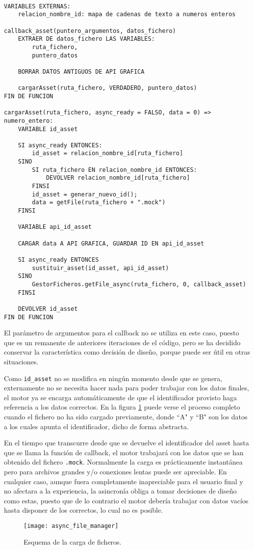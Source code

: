 \begin{lstlisting}

VARIABLES EXTERNAS:
    relacion_nombre_id: mapa de cadenas de texto a numeros enteros
    
callback_asset(puntero_argumentos, datos_fichero)
    EXTRAER DE datos_fichero LAS VARIABLES:
        ruta_fichero,
        puntero_datos
        
    BORRAR DATOS ANTIGUOS DE API GRAFICA
    
    cargarAsset(ruta_fichero, VERDADERO, puntero_datos)
FIN DE FUNCION

cargarAsset(ruta_fichero, async_ready = FALSO, data = 0) => numero_entero:
    VARIABLE id_asset
    
    SI async_ready ENTONCES:
        id_asset = relacion_nombre_id[ruta_fichero]
    SINO
        SI ruta_fichero EN relacion_nombre_id ENTONCES:
            DEVOLVER relacion_nombre_id[ruta_fichero]
        FINSI
        id_asset = generar_nuevo_id();
        data = getFile(ruta_fichero + ".mock")
    FINSI
    
    VARIABLE api_id_asset
    
    CARGAR data A API GRAFICA, GUARDAR ID EN api_id_asset
    
    SI async_ready ENTONCES
        sustituir_asset(id_asset, api_id_asset)
    SINO
        GestorFicheros.getFile_async(ruta_fichero, 0, callback_asset)
    FINSI
    
    DEVOLVER id_asset
FIN DE FUNCION
\end{lstlisting}

El parámetro de argumentos para el callback no se utiliza en este caso, puesto que es un remanente de anteriores iteraciones de el código, pero se ha decidido conservar la característica como decisión de diseño, porque puede ser útil en otras situaciones.

Como \texttt{id\_asset} no se modifica en ningún momento desde que se genera, externamente no se necesita hacer nada para poder trabajar con los datos finales, el motor ya se encarga automáticamente de que el identificador provisto haga referencia a los datos correctos. En la figura \ref{fig:async_file_manager} puede verse el proceso completo cuando el fichero no ha sido cargado previamente, donde ``A" y ``B" son los datos a los cuales apunta el identificador, dicho de forma abstracta.

En el tiempo que transcurre desde que se devuelve el identificador del asset hasta que se llama la función de callback, el motor trabajará con los datos que se han obtenido del fichero \texttt{.mock}. Normalmente la carga es prácticamente instantánea pero para archivos grandes y/o conexiones lentas puede ser apreciable. En cualquier caso, aunque fuera completamente inapreciable para el usuario final y no afectara a la experiencia, la asincronía obliga a tomar decisiones de diseño como estas, puesto que de lo contrario el motor debería trabajar con datos vacíos hasta disponer de los correctos, lo cual no es posible.

\begin{figure}[H]
    \centering
    \texttt{[image: async\_file\_manager]}
    \caption{Esquema de la carga de ficheros.}
    \label{fig:async_file_manager}
\end{figure}
